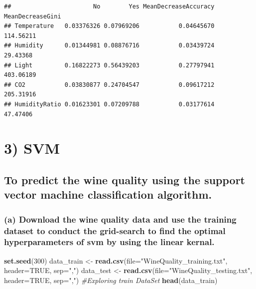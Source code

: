 \documentclass[]{article}
\newenvironment{Shaded}{\begin{snugshade}}{\end{snugshade}}
\newcommand{\CommentTok}[1]{\textcolor[rgb]{0.56,0.35,0.01}{\textit{#1}}}
\newcommand{\DataTypeTok}[1]{\textcolor[rgb]{0.13,0.29,0.53}{#1}}
\newcommand{\DecValTok}[1]{\textcolor[rgb]{0.00,0.00,0.81}{#1}}
\newcommand{\KeywordTok}[1]{\textcolor[rgb]{0.13,0.29,0.53}{\textbf{#1}}}
\newcommand{\NormalTok}[1]{#1}
\newcommand{\OperatorTok}[1]{\textcolor[rgb]{0.81,0.36,0.00}{\textbf{#1}}}
\newcommand{\OtherTok}[1]{\textcolor[rgb]{0.56,0.35,0.01}{#1}}
\newcommand{\StringTok}[1]{\textcolor[rgb]{0.31,0.60,0.02}{#1}}
\begin{document}
\begin{Shaded}
\end{Shaded}

\begin{verbatim}
##                       No        Yes MeanDecreaseAccuracy MeanDecreaseGini
## Temperature   0.03376326 0.07969206           0.04645670        114.56211
## Humidity      0.01344981 0.08876716           0.03439724         29.43368
## Light         0.16822273 0.56439203           0.27797941        403.06189
## CO2           0.03830877 0.24704547           0.09617212        205.31916
## HumidityRatio 0.01623301 0.07209788           0.03177614         47.47406
\end{verbatim}

\hypertarget{svm}{%
\section{3) SVM}\label{svm}}

\hypertarget{to-predict-the-wine-quality-using-the-support-vector-machine-classification-algorithm.}{%
\subsection{To predict the wine quality using the support vector machine
classification
algorithm.}\label{to-predict-the-wine-quality-using-the-support-vector-machine-classification-algorithm.}}

\hypertarget{a-download-the-wine-quality-data-and-use-the-training-dataset-to-conduct-the-grid-search-to-find-the-optimal-hyperparameters-of-svm-by-using-the-linear-kernal.}{%
\subsubsection{(a) Download the wine quality data and use the training
dataset to conduct the grid-search to find the optimal hyperparameters
of svm by using the linear
kernal.}\label{a-download-the-wine-quality-data-and-use-the-training-dataset-to-conduct-the-grid-search-to-find-the-optimal-hyperparameters-of-svm-by-using-the-linear-kernal.}}

\begin{Shaded}
\begin{Highlighting}[]
\KeywordTok{set.seed}\NormalTok{(}\DecValTok{300}\NormalTok{)}
\NormalTok{data_train <-}\StringTok{ }\KeywordTok{read.csv}\NormalTok{(}\DataTypeTok{file=}\StringTok{"WineQuality_training.txt"}\NormalTok{, }\DataTypeTok{header=}\OtherTok{TRUE}\NormalTok{, }\DataTypeTok{sep=}\StringTok{","}\NormalTok{)}
\NormalTok{data_test <-}\StringTok{ }\KeywordTok{read.csv}\NormalTok{(}\DataTypeTok{file=}\StringTok{"WineQuality_testing.txt"}\NormalTok{, }\DataTypeTok{header=}\OtherTok{TRUE}\NormalTok{, }\DataTypeTok{sep=}\StringTok{","}\NormalTok{)}
\CommentTok{#Exploring train DataSet}
\KeywordTok{head}\NormalTok{(data_train)}
\end{Highlighting}
\end{Shaded}
\end{document}
